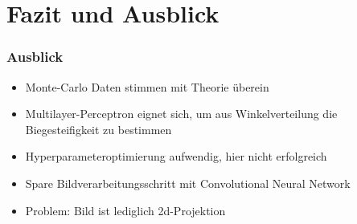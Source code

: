 \section{Fazit und Ausblick}

\begin{frame}
  \frametitle{Ausblick}
  \begin{itemize}
    \item Monte-Carlo Daten stimmen mit Theorie überein
    \item Multilayer-Perceptron eignet sich, um aus Winkelverteilung
    die Biegesteifigkeit zu bestimmen
    \item Hyperparameteroptimierung aufwendig, hier nicht erfolgreich
    \item Spare Bildverarbeitungsschritt mit Convolutional Neural Network
    \item Problem: Bild ist lediglich 2d-Projektion
  \end{itemize}
\end{frame}

